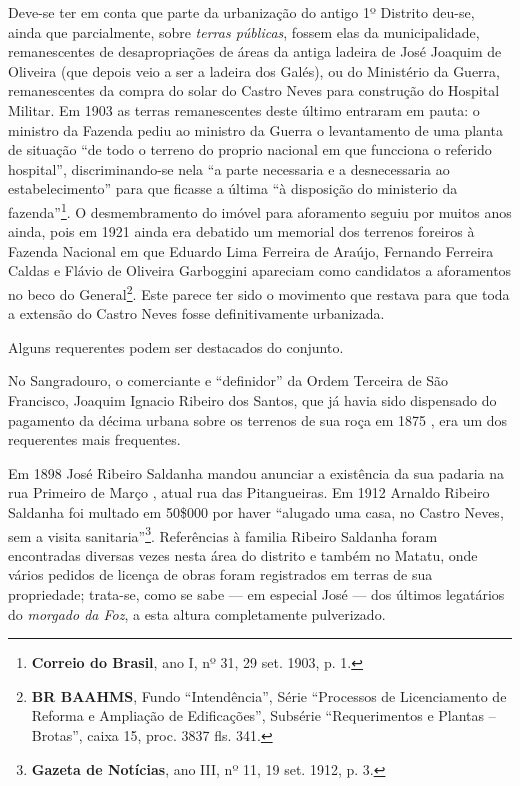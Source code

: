 Deve-se ter em conta que parte da urbanização do antigo 1º Distrito deu-se, ainda que parcialmente, sobre \textit{terras públicas}, fossem elas da municipalidade, remanescentes de desapropriações de áreas da antiga ladeira de José Joaquim de Oliveira (que depois veio a ser a ladeira dos Galés), ou do Ministério da Guerra, remanescentes da compra do solar do Castro Neves para construção do Hospital Militar. Em 1903 as terras remanescentes deste último entraram em pauta: o ministro da Fazenda pediu ao ministro da Guerra o levantamento de uma planta de situação ``de todo o terreno do proprio nacional em que funcciona o referido hospital'', discriminando-se nela ``a parte necessaria e a desnecessaria ao estabelecimento'' para que ficasse a última ``à disposição do ministerio da fazenda''\footnote{\textbf{Correio do Brasil}, ano I, nº 31, 29 set. 1903, p. 1.}. O desmembramento do imóvel para aforamento seguiu por muitos anos ainda, pois em 1921 ainda era debatido um memorial dos terrenos foreiros à Fazenda Nacional em que Eduardo Lima Ferreira de Araújo, Fernando Ferreira Caldas e Flávio de Oliveira Garboggini apareciam como candidatos a aforamentos no beco do General\footnote{\textbf{BR BAAHMS}, Fundo ``Intendência'', Série ``Processos de Licenciamento de Reforma e Ampliação de Edificações'', Subsérie ``Requerimentos e Plantas -- Brotas'', caixa 15, proc. 3837 fls. 341.}. Este parece ter sido o movimento que restava para que toda a extensão do Castro Neves fosse definitivamente urbanizada.

Alguns requerentes podem ser destacados do conjunto.


No Sangradouro, o comerciante e ``definidor'' da Ordem Terceira de São Francisco, Joaquim Ignacio Ribeiro dos Santos, que já havia sido dispensado do pagamento da décima urbana sobre os terrenos de sua roça em 1875 \cite[p.~226]{bahia_assembleia_1875}, era um dos requerentes mais frequentes.

Em 1898 José Ribeiro Saldanha mandou anunciar a existência da sua padaria na rua Primeiro de Março \cite[p.~436]{reis_almanak_1898}, atual rua das Pitangueiras. Em 1912 Arnaldo Ribeiro Saldanha foi multado em 50\$000 por haver ``alugado uma casa, no Castro Neves, sem a visita sanitaria''\footnote{\textbf{Gazeta de Notícias}, ano III, nº 11, 19 set. 1912, p. 3.}. Referências à familia Ribeiro Saldanha foram encontradas diversas vezes nesta área do distrito e também no Matatu, onde vários pedidos de licença de obras foram registrados em terras de sua propriedade; trata-se, como se sabe --- em especial José --- dos últimos legatários do \textit{morgado da Foz}, a esta altura completamente pulverizado.

